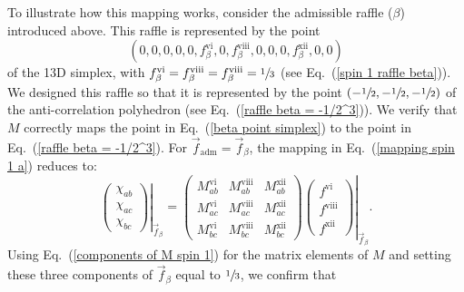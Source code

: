 To illustrate how this mapping works, consider the admissible raffle ($\beta$) introduced above. This raffle is represented by the point
\begin{equation}
(0, 0, 0, 0, 0, f^{\mathrm{vi}}_\beta, 0, f^{\mathrm{viii}}_\beta, 0, 0, 0, f^{\mathrm{xii}}_\beta, 0, 0)
\label{beta point simplex}
\end{equation}
of the 13D simplex, with $f^{\mathrm{vi}}_\beta = f^{\mathrm{viii}}_\beta = f^{\mathrm{viii}}_\beta = \sfrac13$ (see Eq.\ (\ref{spin 1 raffle beta})). We designed this raffle so that it is represented by the point $(-\sfrac12, -\sfrac12, -\sfrac12)$ of the anti-correlation polyhedron (see Eq.\ (\ref{raffle beta = -1/2^3})). We verify that $M$ correctly maps the point in Eq.\ (\ref{beta point simplex}) to the point in Eq.\ (\ref{raffle beta = -1/2^3}). For $\vec{f}_{\mathrm{adm}} = \vec{f}_\beta$, the mapping in Eq.\ (\ref{mapping spin 1 a}) reduces to:
\begin{equation}
\left. \begin{pmatrix}
\chi_{ab}\\[.3cm]
\chi_{ac}\\[.3cm]
\chi_{bc}
\end{pmatrix} \right|_{\vec{f}_\beta} = 
\left. \begin{pmatrix}
M_{ab}^{\mathrm{vi}} & \!\! M_{ab}^{\mathrm{viii}} \!\! & M_{ab}^{\mathrm{xii}} \\[.3cm]
M_{ac}^{\mathrm{vi}} & \!\! M_{ac}^{\mathrm{viii}} \!\! & M_{ac}^{\mathrm{xii}} \\[.3cm]
M_{bc}^{\mathrm{vi}} & \!\! M_{bc}^{\mathrm{viii}} \!\! & M_{bc}^{\mathrm{xii}}
 \end{pmatrix}
\!\! \begin{pmatrix}
f^{\mathrm{vi}} \\[.3cm]
f^{\mathrm{viii}} \\[.3cm]
f^{\mathrm{xii}}
\end{pmatrix} \right|_{\vec{f}_\beta}.
\label{mapping for raffle beta}
\end{equation}
Using  Eq.\ (\ref{components of M spin 1}) for the matrix elements of $M$ and setting these three components of $\vec{f}_\beta$ equal to $\sfrac13$, we confirm that
